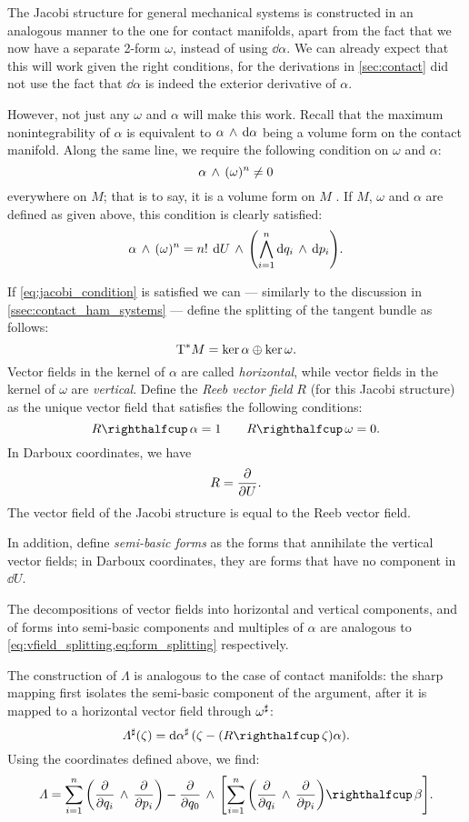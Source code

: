 The Jacobi structure for general mechanical systems is constructed in an analogous manner to the one for contact manifolds, apart from the fact that we now have a separate 2-form $\omega$, instead of using $\dd{\alpha}$. We can already expect that this will work given the right conditions, for the derivations in \cref{sec:contact} did not use the fact that $\dd{\alpha}$ is indeed the exterior derivative of $\alpha$. 

However, not just any $\omega$ and $\alpha$ will make this work. Recall that the maximum nonintegrability of $\alpha$ is equivalent to $ \alpha\,\wedge\,\dd{\alpha} $ being a volume form on the contact manifold. Along the same line, we require the following condition on $\omega$ and $\alpha$:
\begin{equation}
     \alpha\,\wedge\,(\omega)^n  \neq 0
    \label{eq:jacobi_condition}
\end{equation}
everywhere on $M$; that is to say, it is a volume form on $M$ \cite{ciaglia2018}. If $M$, $\omega$ and $\alpha$ are defined as given above, this condition is clearly satisfied:
$$  \alpha\,\wedge\,(\omega)^n  = n!\: \dd{U}\,\wedge\,\qty(\bigwedge_{i=1}^{n} \dd{q_i}\,\wedge\,\dd{p_i} ) . $$

If \cref{eq:jacobi_condition} is satisfied we can --- similarly to the discussion in \cref{ssec:contact_ham_systems} --- define the splitting of the tangent bundle as follows:
$$ \mathrm{T}^*M = \ker{\alpha}\oplus\ker{\omega}. $$
Vector fields in the kernel of $\alpha$ are called \emph{horizontal}, while vector fields in the kernel of $\omega$ are \emph{vertical}. Define the \emph{Reeb vector field} $R$ (for this Jacobi structure) as the unique vector field that satisfies the following conditions:
$$ \intpr{R}{\alpha} = 1 \qquad \intpr{R}{\omega} = 0. $$
In Darboux coordinates, we have
$$ R = \pdv{}{U}. $$
The vector field of the Jacobi structure is equal to the Reeb vector field.

In addition, define \emph{semi-basic forms} as the forms that annihilate the vertical vector fields; in Darboux coordinates, they are forms that have no component in $\dd{U}$.

The decompositions of vector fields into horizontal and vertical components, and of forms into semi-basic components and multiples of $\alpha$ are analogous to \cref{eq:vfield_splitting,eq:form_splitting} respectively.

The construction of $\Lambda$ is analogous to the case of contact manifolds: the sharp mapping first isolates the semi-basic component of the argument, after it is mapped to a horizontal vector field through $\omega^\sharp$:
$$ \fromDual{\Lambda}(\zeta) = \fromDual{\dd{\alpha}}\qty(\zeta - (\intpr{R}{\zeta})\alpha). $$
Using the coordinates defined above, we find:
$$ \Lambda = \sum_{i=1}^n \qty(\wedgep{\pdv{}{q_i}}{\pdv{}{p_i}}) - \wedgep{\pdv{}{q_0}}{\qty[\intpr{\sum_{i=1}^n \qty(\wedgep{\pdv{}{q_i}}{\pdv{}{p_i}})}{\beta}]}.$$

